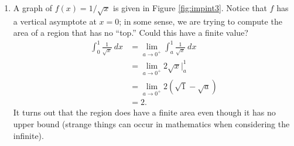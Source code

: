 {\begin{enumerate}
\item		A graph of $f(x) = 1/\sqrt{x}$ is given in Figure \ref{fig:impint3}. Notice that $f$ has a vertical asymptote at $x=0$; in some sense, we are trying to compute the area of a region that has no ``top.'' Could this have a finite value? 
\begin{align*} \int_0^1 \frac{1}{\sqrt{x}}\ dx &= \lim_{a\to0^+}\int_a^1 \frac1{\sqrt{x}}\ dx \\
			&=	\lim_{a\to0^+} 2\sqrt{x}\Big|_a^1 \\
			&= \lim_{a\to0^+} 2\left(\sqrt{1}-\sqrt{a}\right)\\
			&=	2.
\end{align*}
It turns out that the region does have a finite area even though it has no upper bound (strange things can occur in mathematics when considering the infinite).




\end{enumerate}}
